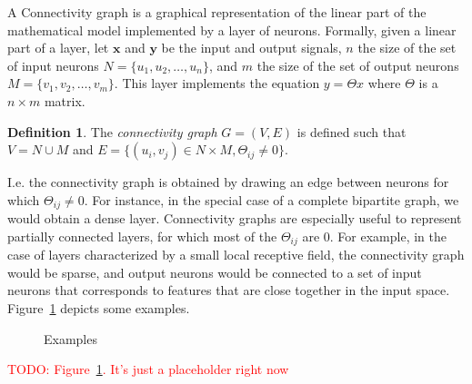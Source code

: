 \documentclass{article}
\theoremstyle{definition}
\newtheorem{definition}{Definition}[section]
\newcommand{\todo}[1]{\textcolor{red}{TODO: #1}}
\begin{document}
A Connectivity graph is a graphical representation of the linear part of the mathematical model implemented by a layer of neurons.
Formally, given a linear part of a layer, let $\textbf{x}$ and $\textbf{y}$ be the input and output signals, $n$ the size of the set of input neurons $N = \{u_1, u_2, \ldots, u_n\}$, and $m$ the size of the set of output neurons $M = \{v_1, v_2, \ldots, v_m\}$. This layer implements the equation $y = \Theta x$ where $\Theta$ is a $n \times m$ matrix.

\begin{definition}
{The \emph{connectivity graph} $G = (V,E)$ is defined such that $V = N \cup M$ and $E = \{(u_i,v_j) \in  N \times M, \Theta_{ij} \neq 0 \} $.}
\end{definition}

I.e. the connectivity graph is obtained by drawing an edge between neurons for which $\Theta_{ij} \neq 0$.
For instance, in the special case of a complete bipartite graph, we would obtain a dense layer. 
Connectivity graphs are especially useful to represent partially connected layers, for which most of the $\Theta_{ij}$ are $0$. 
For example, in the case of layers characterized by a small local receptive field, the connectivity graph would be sparse, and output neurons would be connected to a set of input neurons that corresponds to features that are close together in the input space. Figure~\ref{con_ex} depicts some examples.

\begin{figure}[h]
  \begin{center}
  \end{center}
  \caption{Examples}
  \label{con_ex}
\end{figure}

\todo{Figure~\ref{con_ex}. It's just a placeholder right now}
\end{document}
